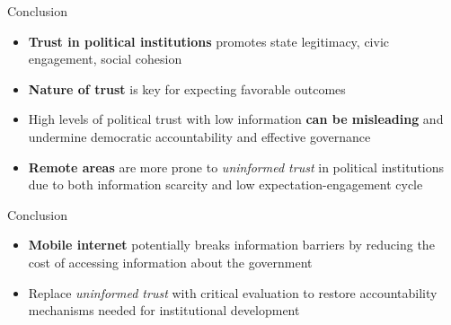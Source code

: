 \documentclass[10pt]{beamer}
\begin{document}
    

    

    

    

    


\begin{frame}{Conclusion}
    \begin{itemize}\setlength\itemsep{1em}
        \item \textbf{Trust in political institutions} promotes state legitimacy, civic engagement, social cohesion\vfill
        \item \textbf{Nature of trust} is key for expecting favorable outcomes\vfill
        \item High levels of political trust with low information \textbf{can be misleading} and undermine democratic accountability
        and effective governance\vfill
        \item \textbf{Remote areas} are more prone to \textit{uninformed trust} in political institutions due
        to both information scarcity and low expectation-engagement cycle\vfill

    \end{itemize}
\end{frame}

\begin{frame}{Conclusion}

    \begin{itemize}\setlength\itemsep{1em}
        \item \textbf{Mobile internet} potentially breaks information barriers by reducing the
        cost of accessing information about the government\vfill
        \item Replace \textit{uninformed trust} with critical evaluation to restore accountability mechanisms needed for institutional development\vfill
    \end{itemize}

\end{frame}
\end{document}
